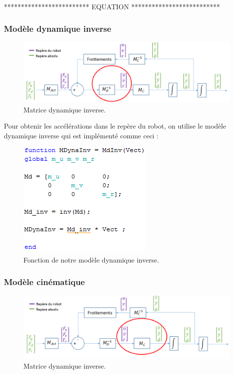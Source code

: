 \documentclass[a4paper,10pt]{article}
\begin{document}
************************* EQUATION **************************

\subsubsection{Modèle dynamique inverse}
\begin{figure}[H]
\bigcenter\includegraphics[scale=0.5]{images/modeledynamiqueinverse.png}
\caption{Matrice dynamique inverse.}
\end{figure}

Pour obtenir les accélérations dans le repère du robot, on utilise le modèle dynamique inverse qui est implémenté comme ceci :

\begin{figure}[H]
\bigcenter\includegraphics[scale=0.8]{images/dynamique_inverse.png}
\caption{Fonction de notre modèle dynamique inverse.}
\end{figure}

\subsubsection{Modèle cinématique}
\begin{figure}[H]
\bigcenter\includegraphics[scale=0.5]{images/modelecinematique.png}
\caption{Matrice dynamique inverse.}
\end{figure}
\end{document}
